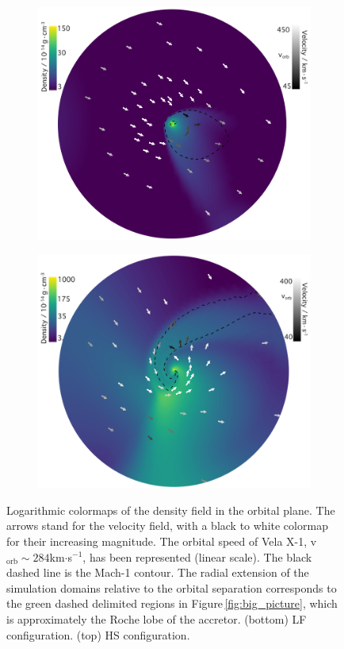 \documentclass{aa}
\begin{document}
\begin{figure}
\begin{subfigure}{.5\textwidth}
\centering
\includegraphics[width=0.99\columnwidth]{Pictures/LF_adiab.jpeg}
  \label{fig:sfig1}
\end{subfigure}
\begin{subfigure}{.5\textwidth}
\centering
\includegraphics[width=0.99\columnwidth]{Pictures/HS_adiab.jpeg}
  \label{fig:sfig2}
\end{subfigure}
\caption{Logarithmic colormaps of the density field in the orbital plane. The arrows stand for the velocity field, with a black to white colormap for their increasing magnitude. The orbital speed of Vela X-1, v$_{\text{orb}}\sim284$km$\cdot$s$^{-1}$, has been represented (linear scale). The black dashed line is the Mach-1 contour. The radial extension of the simulation domains relative to the orbital separation corresponds to the green dashed delimited regions in Figure\,\ref{fig:big_picture}, which is approximately the Roche lobe of the accretor. (bottom) LF configuration. (top) HS configuration.}
\label{fig:adiab}
\end{figure} 
\end{document}
